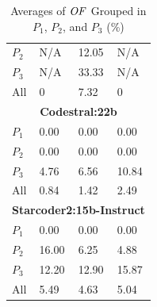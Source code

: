 \begin{table}
\begin{tabularx}{\textwidth}{l X X X}
$P_2$ 
& N/A 
& 12.05
& N/A\\
$P_3$ 
& N/A
& 33.33
& N/A\\
All 
& 0 
& 7.32
& 0\\
\midrule
\multicolumn{4}{c}{\small\textbf{Codestral:22b}} \\
\midrule
$P_1$ 
& 0.00
& 0.00
& 0.00\\
$P_2$ 
& 0.00
& 0.00
& 0.00\\
$P_3$ 
& 4.76
& 6.56
& 10.84\\
All 
& 0.84 
& 1.42
& 2.49\\
\midrule
\multicolumn{4}{c}{\small\textbf{Starcoder2:15b-Instruct}} \\
\midrule
$P_1$ 
& 0.00
& 0.00
& 0.00\\
$P_2$ 
& 16.00 
& 6.25
& 4.88\\
$P_3$ 
& 12.20 
& 12.90 
& 15.87\\
All 
& 5.49 
& 4.63
& 5.04\\
\bottomrule
\end{tabularx}
\caption{Averages of $\mathit{OF}$ Grouped in $P_1$, $P_2$, and $P_3$ (\%)}
\label{tab:fgi_of}
\end{table}

